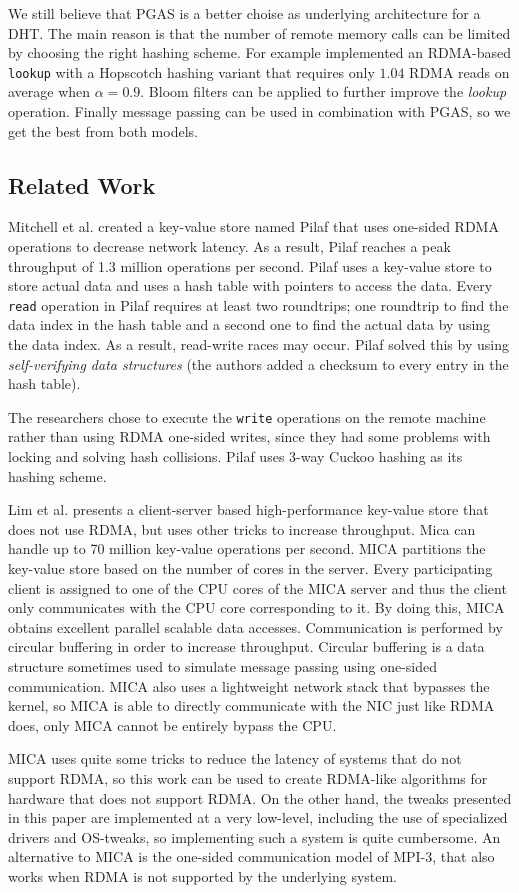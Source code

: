 We still believe that PGAS is a better choise as underlying architecture for a DHT. The main reason is that the number of remote memory calls can be limited by choosing the right hashing scheme. For example \cite{farm} implemented an RDMA-based \texttt{lookup} with a Hopscotch hashing variant that requires only $1.04$ RDMA reads on average when $\alpha = 0.9$. Bloom filters can be applied to further improve the \emph{lookup} operation. Finally message passing can be used in combination with PGAS, so we get the best from both models.

\subsection{Related Work}
Mitchell et al. \cite{pilaf} created a key-value store named Pilaf that uses one-sided RDMA operations to decrease network latency. As a result, Pilaf reaches a peak throughput of 1.3 million operations per second. Pilaf uses a key-value store to store actual data and uses a hash table with pointers to access the data. Every \texttt{read} operation in Pilaf requires at least two roundtrips; one roundtrip to find the data index in the hash table and a second one to find the actual data by using the data index. As a result, read-write races may occur. Pilaf solved this by using \emph{self-verifying data structures} (the authors added a checksum to every entry in the hash table). 

The researchers chose to execute the \texttt{write} operations on the remote machine rather than using RDMA one-sided writes, since they had some problems with locking and solving hash collisions. Pilaf uses 3-way Cuckoo hashing as its hashing scheme.

Lim et al. \cite{mica} presents a client-server based high-performance key-value store that does not use RDMA, but uses other tricks to increase throughput. Mica can handle up to 70 million key-value operations per second. MICA partitions the key-value store based on the number of cores in the server. Every participating client is assigned to one of the CPU cores of the MICA server and thus the client only communicates with the CPU core corresponding to it. By doing this, MICA obtains excellent parallel scalable data accesses. Communication is performed by circular buffering in order to increase throughput. Circular buffering is a data structure sometimes used to simulate message passing using one-sided communication. MICA also uses a lightweight network stack that bypasses the kernel, so MICA is able to directly communicate with the NIC just like RDMA does, only MICA cannot be entirely bypass the CPU.

MICA uses quite some tricks to reduce the latency of systems that do not support RDMA, so this work can be used to create RDMA-like algorithms for hardware that does not support RDMA. On the other hand, the tweaks presented in this paper are implemented at a very low-level, including the use of specialized drivers and OS-tweaks, so implementing such a system is quite cumbersome. An alternative to MICA is the one-sided communication model of MPI-3, that also works when RDMA is not supported by the underlying system.
